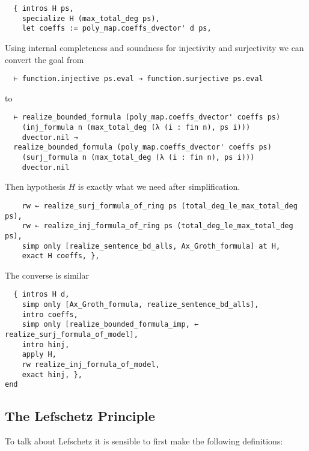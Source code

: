 \begin{lstlisting}
  { intros H ps,
    specialize H (max_total_deg ps),
    let coeffs := poly_map.coeffs_dvector' d ps, \end{lstlisting}

Using internal completeness and soundness for injectivity and surjectivity
we can convert the goal from
\begin{lstlisting}
  ⊢ function.injective ps.eval → function.surjective ps.eval \end{lstlisting}
to
\begin{lstlisting}
  ⊢ realize_bounded_formula (poly_map.coeffs_dvector' coeffs ps)
    (inj_formula n (max_total_deg (λ (i : fin n), ps i)))
    dvector.nil →
  realize_bounded_formula (poly_map.coeffs_dvector' coeffs ps)
    (surj_formula n (max_total_deg (λ (i : fin n), ps i)))
    dvector.nil \end{lstlisting}

Then hypothesis $H$ is exactly what we need after simplification.

\begin{lstlisting}
    rw ← realize_surj_formula_of_ring ps (total_deg_le_max_total_deg ps),
    rw ← realize_inj_formula_of_ring ps (total_deg_le_max_total_deg ps),
    simp only [realize_sentence_bd_alls, Ax_Groth_formula] at H,
    exact H coeffs, }, \end{lstlisting}

The converse is similar
\begin{lstlisting}
  { intros H d,
    simp only [Ax_Groth_formula, realize_sentence_bd_alls],
    intro coeffs,
    simp only [realize_bounded_formula_imp, ← realize_surj_formula_of_model],
    intro hinj,
    apply H,
    rw realize_inj_formula_of_model,
    exact hinj, },
end
\end{lstlisting}

\subsection{The Lefschetz Principle}

To talk about Lefschetz it is sensible to first make the following definitions:

